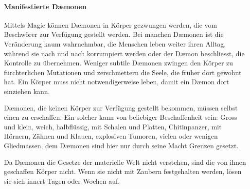 \documentclass[12pt,twoside,twocolumn,openany]{book}
\begin{document}
\paragraph{Manifestierte D\ae monen}
Mittels Magie können D\ae monen in Körper gezwungen werden, die vom Beschwörer zur Verfügung gestellt werden. Bei manchen D\ae monen ist die Veränderung kaum wahrnehmbar, die Menschen leben weiter ihren Alltag, während sie nach und nach korrumpiert werden oder der D\ae mon beschliesst, die Kontrolle zu übernehmen. Weniger subtile D\ae monen zwingen den Körper zu fürchterlichen Mutationen und zerschmettern die Seele, die früher dort gewohnt hat. Ein Körper muss nicht notwendigerweise leben, damit ein D\ae mon dort einziehen kann.

D\ae monen, die keinen Körper zur Verfügung gestellt bekommen, müssen selbst einen zu erschaffen. Ein solcher kann von beliebiger Beschaffenheit sein: Gross und klein, weich, halbflüssig, mit Schalen und Platten, Chitinpanzer, mit Hörnern, Zähnen und Klauen, explosiven Tumoren, vielen oder wenigen Gliedmassen, dem D\ae monen sind hier nur durch seine Macht Grenzen gesetzt.

Da D\ae monen die Gesetze der materielle Welt nicht verstehen, sind die von ihnen geschaffen Körper nicht. Wenn sie nicht mit Zaubern festgehalten werden, lösen sie sich innert Tagen oder Wochen auf.
\end{document}
